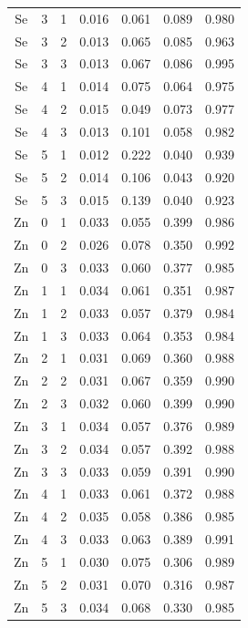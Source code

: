 \documentclass[ms, hidelinks]{uncgdissertationexp}
\theoremstyle{plain}
\theoremstyle{definition}
\theoremstyle{remark}
\begin{document}
\begin{longtable}{ccccccc}
Se & 3 & 1 & 0.016 & 0.061 & 0.089 & 0.980\\
\rowcolor{gray!6}  Se & 3 & 2 & 0.013 & 0.065 & 0.085 & 0.963\\
Se & 3 & 3 & 0.013 & 0.067 & 0.086 & 0.995\\
\rowcolor{gray!6}  Se & 4 & 1 & 0.014 & 0.075 & 0.064 & 0.975\\
Se & 4 & 2 & 0.015 & 0.049 & 0.073 & 0.977\\
\rowcolor{gray!6}  Se & 4 & 3 & 0.013 & 0.101 & 0.058 & 0.982\\
Se & 5 & 1 & 0.012 & 0.222 & 0.040 & 0.939\\
\rowcolor{gray!6}  Se & 5 & 2 & 0.014 & 0.106 & 0.043 & 0.920\\
Se & 5 & 3 & 0.015 & 0.139 & 0.040 & 0.923\\
\rowcolor{gray!6}  Zn & 0 & 1 & 0.033 & 0.055 & 0.399 & 0.986\\
Zn & 0 & 2 & 0.026 & 0.078 & 0.350 & 0.992\\
\rowcolor{gray!6}  Zn & 0 & 3 & 0.033 & 0.060 & 0.377 & 0.985\\
Zn & 1 & 1 & 0.034 & 0.061 & 0.351 & 0.987\\
\rowcolor{gray!6}  Zn & 1 & 2 & 0.033 & 0.057 & 0.379 & 0.984\\
Zn & 1 & 3 & 0.033 & 0.064 & 0.353 & 0.984\\
\rowcolor{gray!6}  Zn & 2 & 1 & 0.031 & 0.069 & 0.360 & 0.988\\
Zn & 2 & 2 & 0.031 & 0.067 & 0.359 & 0.990\\
\rowcolor{gray!6}  Zn & 2 & 3 & 0.032 & 0.060 & 0.399 & 0.990\\
Zn & 3 & 1 & 0.034 & 0.057 & 0.376 & 0.989\\
\rowcolor{gray!6}  Zn & 3 & 2 & 0.034 & 0.057 & 0.392 & 0.988\\
Zn & 3 & 3 & 0.033 & 0.059 & 0.391 & 0.990\\
\rowcolor{gray!6}  Zn & 4 & 1 & 0.033 & 0.061 & 0.372 & 0.988\\
Zn & 4 & 2 & 0.035 & 0.058 & 0.386 & 0.985\\
\rowcolor{gray!6}  Zn & 4 & 3 & 0.033 & 0.063 & 0.389 & 0.991\\
Zn & 5 & 1 & 0.030 & 0.075 & 0.306 & 0.989\\
\rowcolor{gray!6}  Zn & 5 & 2 & 0.031 & 0.070 & 0.316 & 0.987\\
Zn & 5 & 3 & 0.034 & 0.068 & 0.330 & 0.985\\*
\end{longtable}
\clearpage
\end{document}
